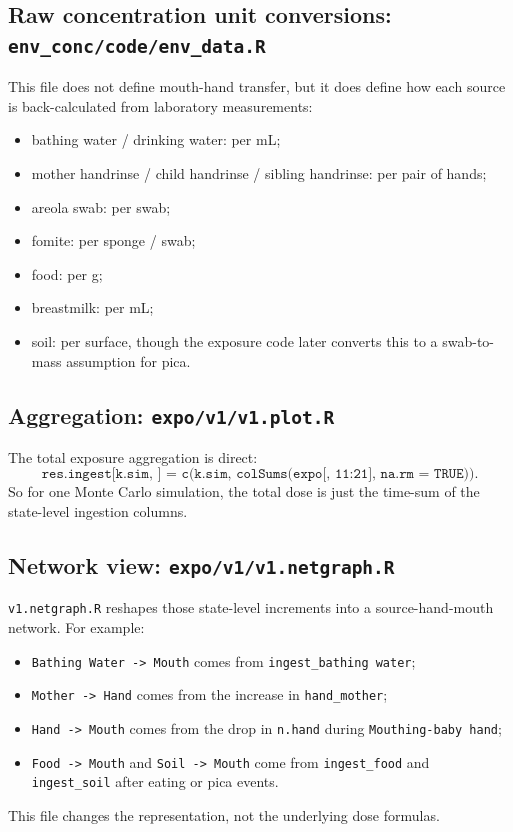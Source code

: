 \documentclass[11pt]{article}
\begin{document}
\subsection{Raw concentration unit conversions: \texttt{env\_conc/code/env\_data.R}}
This file does not define mouth-hand transfer, but it does define how each source is back-calculated from laboratory measurements:
\begin{itemize}[leftmargin=2em]
  \item bathing water / drinking water: per mL;
  \item mother handrinse / child handrinse / sibling handrinse: per pair of hands;
  \item areola swab: per swab;
  \item fomite: per sponge / swab;
  \item food: per g;
  \item breastmilk: per mL;
  \item soil: per surface, though the exposure code later converts this to a swab-to-mass assumption for pica.
\end{itemize}

\subsection{Aggregation: \texttt{expo/v1/v1.plot.R}}
The total exposure aggregation is direct:
\[
\texttt{res.ingest[k.sim, ] = c(k.sim, colSums(expo[, 11:21], na.rm = TRUE))}.
\]
So for one Monte Carlo simulation, the total dose is just the time-sum of the state-level ingestion columns.

\subsection{Network view: \texttt{expo/v1/v1.netgraph.R}}
\texttt{v1.netgraph.R} reshapes those state-level increments into a source-hand-mouth network. For example:
\begin{itemize}[leftmargin=2em]
  \item \texttt{Bathing Water -> Mouth} comes from \texttt{ingest\_bathing water};
  \item \texttt{Mother -> Hand} comes from the increase in \texttt{hand\_mother};
  \item \texttt{Hand -> Mouth} comes from the drop in \texttt{n.hand} during \texttt{Mouthing-baby hand};
  \item \texttt{Food -> Mouth} and \texttt{Soil -> Mouth} come from \texttt{ingest\_food} and \texttt{ingest\_soil} after eating or pica events.
\end{itemize}
This file changes the representation, not the underlying dose formulas.
\end{document}
